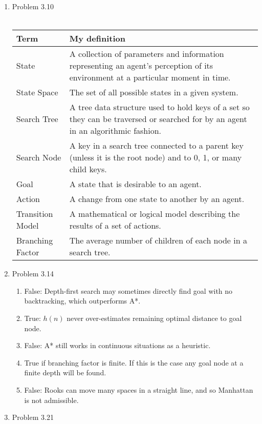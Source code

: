 \documentclass[10pt]{article}
\begin{document}
\begin{enumerate}
\begin{enumerate}
\begin{itemize}
    \end{itemize}
  \end{enumerate}
\item Problem 3.10 \\ \\
  \begin{tabular}{|L|K|}
    \hline
    \textbf{Term} & \textbf{My definition} \\
    \hline
    State & A collection of parameters and information representing an agent's
            perception of its environment at a particular moment in time. \\
    \hline
    State Space & The set of all possible states in a given system. \\
    \hline
    Search Tree & A tree data structure used to hold keys of a set so they can be traversed or searched for by an agent in an algorithmic fashion. \\
    \hline
    Search Node & A key in a search tree connected to a parent key (unless it is the root node) and to 0, 1, or many child keys. \\
    \hline
    Goal & A state that is desirable to an agent. \\
    \hline
    Action & A change from one state to another by an agent. \\
    \hline
    Transition Model & A mathematical or logical model describing the results of a set of actions. \\
    \hline
    Branching Factor & The average number of children of each node in a search tree. \\
    \hline
  \end{tabular}
\item Problem 3.14 
  \begin{enumerate}
    \item False: Depth-first search may sometimes directly find goal with no backtracking, which outperforms A*.
    \item True: $h(n)$ never over-estimates remaining optimal distance to goal node.
    \item False: A* still works in continuous situations as a heuristic.
    \item True if branching factor is finite. If this is the case any goal node at a finite depth will be found.
    \item False: Rooks can move many spaces in a straight line, and so Manhattan is not admissible.
  \end{enumerate}
\item Problem 3.21 

\end{enumerate}
\end{document}
